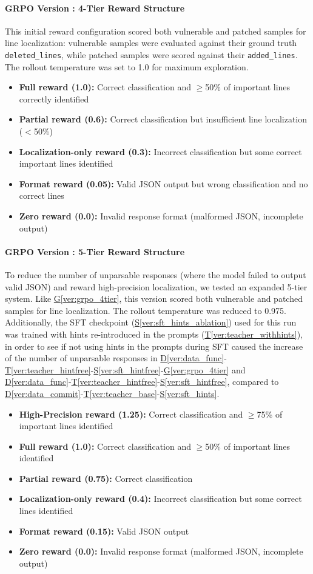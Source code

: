 \documentclass[12pt,a4paper]{article}
\makeatletter
\newcounter{GRPOVer}
\newcommand{\grpoversion}[2]{%
  \stepcounter{GRPOVer}%
  \paragraph{GRPO Version \theGRPOVer: #1}%
  \protected@edef\@currentlabel{\theGRPOVer}\label{#2}%
}
\newcommand{\vcode}[4]{\hyperref[#1]{D\ref*{#1}}-\hyperref[#2]{T\ref*{#2}}-\hyperref[#3]{S\ref*{#3}}-\hyperref[#4]{G\ref*{#4}}}
\newcommand{\vcodeSFT}[3]{\hyperref[#1]{D\ref*{#1}}-\hyperref[#2]{T\ref*{#2}}-\hyperref[#3]{S\ref*{#3}}}
\makeatother
\begin{document}
\grpoversion{4-Tier Reward Structure}{ver:grpo_4tier}
This initial reward configuration scored both vulnerable and patched samples for line localization: vulnerable samples were evaluated against their ground truth \texttt{deleted\_lines}, while patched samples were scored against their \texttt{added\_lines}. The rollout temperature was set to 1.0 for maximum exploration.
\begin{itemize}
\item \textbf{Full reward (1.0):} Correct classification and $\geq$50\% of important lines correctly identified
\item \textbf{Partial reward (0.6):} Correct classification but insufficient line localization ($<$50\%)
\item \textbf{Localization-only reward (0.3):} Incorrect classification but some correct important lines identified
\item \textbf{Format reward (0.05):} Valid JSON output but wrong classification and no correct lines
\item \textbf{Zero reward (0.0):} Invalid response format (malformed JSON, incomplete output)
\end{itemize}

\grpoversion{5-Tier Reward Structure}{ver:grpo_5tier}
To reduce the number of unparsable responses (where the model failed to output valid JSON) and reward high-precision localization, we tested an expanded 5-tier system. Like \hyperref[ver:grpo_4tier]{G\ref*{ver:grpo_4tier}}, this version scored both vulnerable and patched samples for line localization. The rollout temperature was reduced to 0.975. Additionally, the SFT checkpoint (\hyperref[ver:sft_hints_ablation]{S\ref*{ver:sft_hints_ablation}}) used for this run was trained with hints re-introduced in the prompts (\hyperref[ver:teacher_withhints]{T\ref*{ver:teacher_withhints}}), in order to see if not using hints in the prompts during SFT caused the increase of the number of unparsable responses in \vcode{ver:data_func}{ver:teacher_hintfree}{ver:sft_hintfree}{ver:grpo_4tier} and \vcodeSFT{ver:data_func}{ver:teacher_hintfree}{ver:sft_hintfree}, compared to \vcodeSFT{ver:data_commit}{ver:teacher_base}{ver:sft_hints}.
\begin{itemize}
\item \textbf{High-Precision reward (1.25):} Correct classification and $\geq$75\% of important lines identified
\item \textbf{Full reward (1.0):} Correct classification and $\geq$50\% of important lines identified
\item \textbf{Partial reward (0.75):} Correct classification
\item \textbf{Localization-only reward (0.4):} Incorrect classification but some correct lines identified
\item \textbf{Format reward (0.15):} Valid JSON output
\item \textbf{Zero reward (0.0):} Invalid response format (malformed JSON, incomplete output)
\end{itemize}
\end{document}
